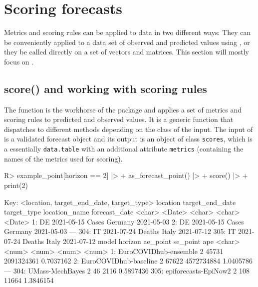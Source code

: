\documentclass[
]{jss}
\begin{document}
\section{Scoring forecasts} \label{sec:scoring}

Metrics and scoring rules can be applied to data in two different ways:
They can be conveniently applied to a data set of observed and predicted
values using , or they be called directly on a set of
vectors and matrices. This section will mostly focus on .

\subsection{score() and working with scoring
rules}\label{score-and-working-with-scoring-rules}

The function  is the workhorse of the package and applies
a set of metrics and scoring rules to predicted and observed values. It
is a generic function that dispatches to different methods depending on
the class of the input. The input of  is a validated
forecast object and its output is an object of class \texttt{scores},
which is a essentially \texttt{data.table} with an additional attribute
\texttt{metrics} (containing the names of the metrics used for scoring).

\begin{CodeChunk}
\begin{CodeInput}
R> example_point[horizon == 2] |>
+   as_forecast_point() |>
+   score() |>
+   print(2)
\end{CodeInput}
\begin{CodeOutput}
Key: <location, target_end_date, target_type>
     location target_end_date target_type location_name forecast_date
       <char>          <Date>      <char>        <char>        <Date>
  1:       DE      2021-05-15       Cases       Germany    2021-05-03
  2:       DE      2021-05-15       Cases       Germany    2021-05-03
 ---                                                                 
304:       IT      2021-07-24      Deaths         Italy    2021-07-12
305:       IT      2021-07-24      Deaths         Italy    2021-07-12
                     model horizon ae_point   se_point       ape
                    <char>   <num>    <num>      <num>     <num>
  1: EuroCOVIDhub-ensemble       2    45731 2091324361 0.7037162
  2: EuroCOVIDhub-baseline       2    67622 4572734884 1.0405786
 ---                                                            
304:       UMass-MechBayes       2       46       2116 0.5897436
305:  epiforecasts-EpiNow2       2      108      11664 1.3846154
\end{CodeOutput}
\end{CodeChunk}
\end{document}
